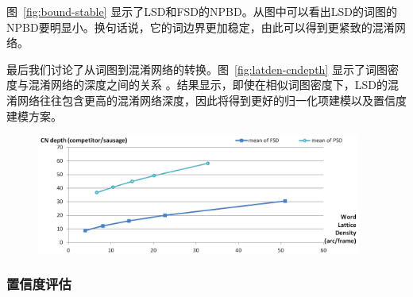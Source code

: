 图~\ref{fig:bound-stable} 显示了LSD和FSD的NPBD。从图中可以看出LSD的词图的NPBD要明显小。换句话说，它的词边界更加稳定，由此可以得到更紧致的混淆网络。

最后我们讨论了从词图到混淆网络的转换。图~\ref{fig:latden-cndepth} 显示了词图密度与混淆网络的深度之间的关系 \cite{hakkani2006beyond}。结果显示，即使在相似词图密度下，LSD的混淆网络往往包含更高的混淆网络深度，因此将得到更好的归一化项建模以及置信度建模方案。 


\begin{figure}[htb]
  \centering
    \captionstyle{\centering}
    \includegraphics[width=0.95\textwidth]{figure/latden-cndepth.png}
\end{figure}






\subsubsection{置信度评估}

